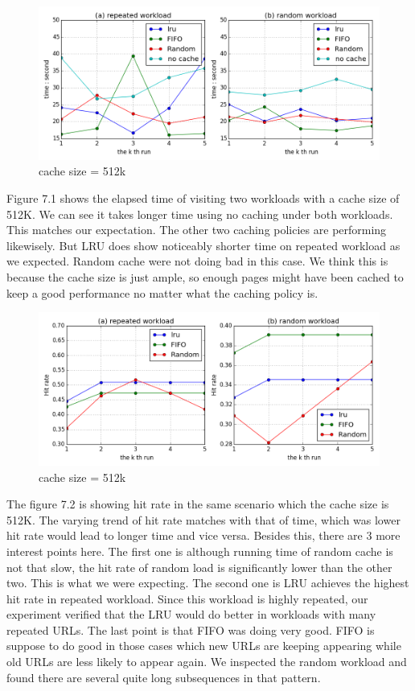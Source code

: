 \documentclass[paper=a4, fontsize=11pt]{scrartcl} %
\numberwithin{equation}{section} %
\numberwithin{figure}{section} %
\numberwithin{table}{section} %
\begin{document}
\begin{figure}[h]
  \centering
  \includegraphics[width=\textwidth]{../data/time512k}
  \caption{cache size = 512k}
  \label{fig:time512k}
\end{figure}
Figure 7.1 shows the elapsed time of visiting two workloads with a cache size of 512K. We can see it takes longer time using no caching under both workloads. This matches our expectation. The other two caching policies are performing likewisely. But LRU does show noticeably shorter time on repeated workload as we expected. Random cache were not doing bad in this case. We think this is because the cache size is just ample, so enough pages might have been cached to keep a good performance no matter what the caching policy is. 
\begin{figure}[h]
  \centering
  \includegraphics[width=\textwidth]{../data/hit512k}
  \caption{cache size = 512k}
  \label{fig:hit512k}
\end{figure}
The figure 7.2 is showing hit rate in the same scenario which the cache size is 512K. The varying trend of hit rate matches with that of time, which was lower hit rate would lead to longer time and vice versa. Besides this, there are 3 more interest points here. The first one is although running time of random cache is not that slow, the hit rate of random load is significantly lower than the other two. This is what we were expecting. The second one is LRU achieves the highest hit rate in repeated workload. Since this workload is highly repeated, our experiment verified that the LRU would do better in workloads with many repeated URLs. The last point is that FIFO was doing very good. FIFO is suppose to do good in those cases which new URLs are keeping appearing while old URLs are less likely to appear again. We inspected the random workload and found there are several quite long subsequences in that pattern.
\end{document}
